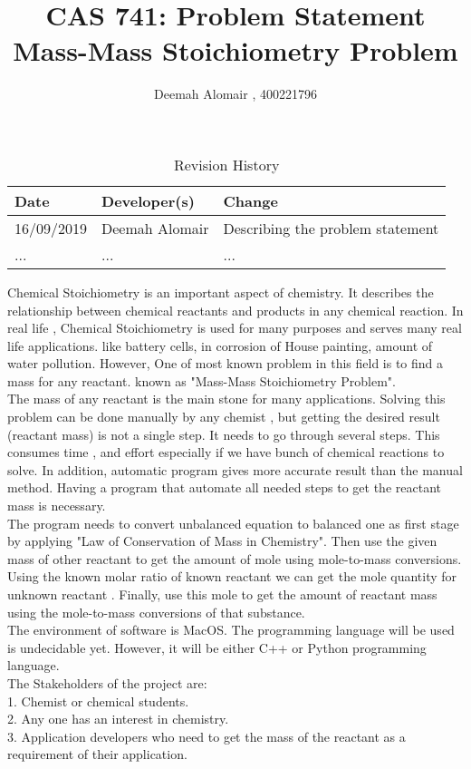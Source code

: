 \documentclass{article}
\title{CAS 741: Problem Statement\\ Mass-Mass Stoichiometry Problem}
\author{Deemah Alomair , 400221796}
\date{}
\begin{document}
\maketitle

\begin{table}[hp]
\caption{Revision History} \label{TblRevisionHistory}
\begin{tabularx}{\textwidth}{llX}
\toprule
\textbf{Date} & \textbf{Developer(s)} & \textbf{Change}\\
\midrule
16/09/2019 & Deemah Alomair & Describing the problem statement \\

... & ... & ...\\
\bottomrule
\end{tabularx}
\end{table}

Chemical Stoichiometry  is an important aspect of chemistry. It describes the relationship between chemical reactants and products in any chemical reaction. In real life , Chemical Stoichiometry is used for many purposes and serves many real life applications. like battery cells, in corrosion of House painting, amount of water pollution. However, One of most known problem in this field is to find a mass for any reactant. known as "Mass-Mass Stoichiometry Problem". \\

The mass of any reactant is the main stone for many applications. Solving this problem can be done manually by any chemist , but  getting  the desired result (reactant mass) is not a single step. It needs to go through several steps. This consumes time , and effort especially if we have bunch of chemical reactions to solve. In addition, automatic program  gives more accurate result than the manual method. Having a program that automate all needed steps to get the reactant mass is necessary. \\
 
 The program needs to convert unbalanced equation to balanced one as first stage by applying  "Law of Conservation of Mass in Chemistry". Then use the given mass of other reactant to get the amount of mole using mole-to-mass conversions. Using the known molar ratio of known reactant we can get the mole quantity for unknown reactant . Finally, use this mole to get the amount of reactant mass using the mole-to-mass conversions of that substance.\\
 
 The environment of software is MacOS. The programming language will be used is undecidable yet. However, it will be either C++ or Python programming language. \\
 
 The Stakeholders of the project are:\\
 
1. Chemist or chemical students.\\

 2. Any one has an interest in chemistry. \\
 
 3. Application developers who need to get the mass of the reactant as a requirement of their application.
\end{document}

